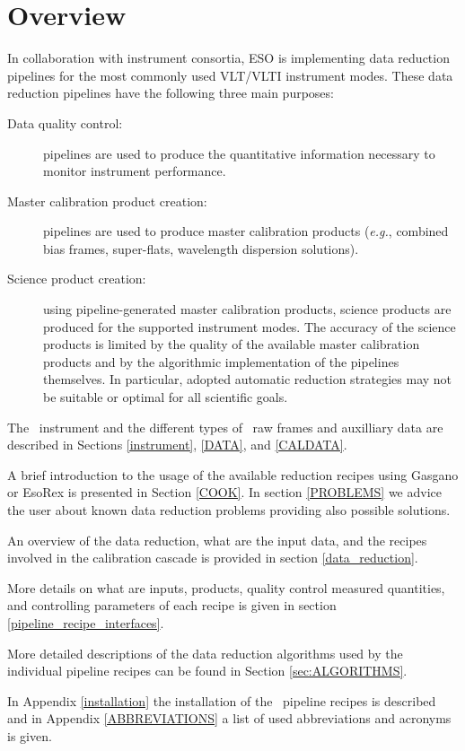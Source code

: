 \section{Overview}
\label{OVER}

In collaboration with instrument consortia, ESO is
implementing data reduction pipelines for the most commonly used VLT/VLTI
instrument modes. These data reduction pipelines have the following three
main purposes:

\begin{description}
\item [Data quality control:] pipelines are used to produce the
quantitative information necessary to monitor instrument performance.
\item [Master calibration product creation:] pipelines are used to
produce master calibration products ({\it e.g.}, combined bias frames,
super-flats, wavelength dispersion solutions).
\item [Science product creation:] using pipeline-generated master
calibration products, science products are produced for the supported
instrument modes. The
accuracy of the science products is limited by the quality of the
available master calibration products and by the algorithmic
implementation of the pipelines themselves. In particular, adopted
automatic reduction strategies may not be suitable or optimal for all
scientific goals.
\end{description}

The \instname\, instrument and the different types of \instname\, raw frames 
and auxilliary data are described in Sections \ref{instrument}, \ref{DATA}, and \ref{CALDATA}.

A brief introduction to the usage of the available reduction recipes 
using Gasgano or EsoRex is presented in Section \ref{COOK}.
In section \ref{PROBLEMS} we advice the user 
about known data reduction problems providing also possible solutions.

An overview of the data reduction, what 
are the input data, and the recipes involved in the calibration cascade 
is provided in section \ref{data_reduction}.

More details on what are inputs, products, quality control measured quantities,
 and controlling parameters of each recipe is given 
in section \ref{pipeline_recipe_interfaces}.

More detailed descriptions of the data reduction algorithms used by
the individual pipeline recipes can be found in Section \ref{sec:ALGORITHMS}.

In Appendix \ref{installation} the installation of the \pipename\, pipeline 
recipes is described and 
in Appendix \ref{ABBREVIATIONS} a list of used abbreviations and acronyms 
is given.

